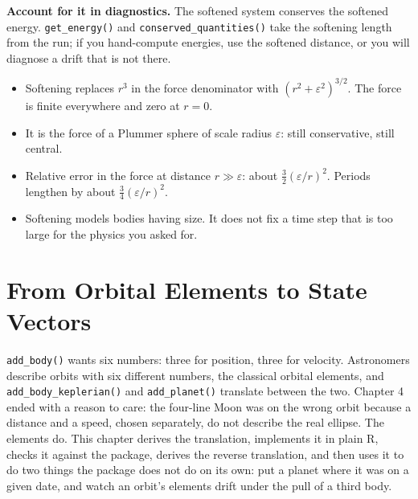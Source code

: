 \documentclass[
  10.5pt,
  letterpaper,
]{scrbook}
\providecommand{\tightlist}{%
  \setlength{\itemsep}{0pt}\setlength{\parskip}{0pt}}
\theoremstyle{plain}
\theoremstyle{remark}
\begin{document}
\textbf{Account for it in diagnostics.} The softened system conserves
the softened energy. \texttt{get\_energy()} and
\texttt{conserved\_quantities()} take the softening length from the run;
if you hand-compute energies, use the softened distance, or you will
diagnose a drift that is not there.

\begin{tcolorbox}[enhanced jigsaw, arc=.35mm, bottomrule=.15mm, bottomtitle=1mm, breakable, colback=white, colbacktitle=quarto-callout-tip-color!10!white, colframe=quarto-callout-tip-color-frame, coltitle=black, left=2mm, leftrule=.75mm, opacityback=0, opacitybacktitle=0.6, rightrule=.15mm, title={Key results}, titlerule=0mm, toprule=.15mm, toptitle=1mm]

\begin{itemize}
\tightlist
\item
  Softening replaces \(r^3\) in the force denominator with
  \((r^2+\varepsilon^2)^{3/2}\). The force is finite everywhere and zero
  at \(r = 0\).
\item
  It is the force of a Plummer sphere of scale radius \(\varepsilon\):
  still conservative, still central.
\item
  Relative error in the force at distance \(r \gg \varepsilon\): about
  \(\tfrac32(\varepsilon/r)^2\). Periods lengthen by about
  \(\tfrac34(\varepsilon/r)^2\).
\item
  Softening models bodies having size. It does not fix a time step that
  is too large for the physics you asked for.
\end{itemize}

\end{tcolorbox}

\chapter{From Orbital Elements to State Vectors}\label{sec-keplerian}

\texttt{add\_body()} wants six numbers: three for position, three for
velocity. Astronomers describe orbits with six different numbers, the
classical orbital elements, and \texttt{add\_body\_keplerian()} and
\texttt{add\_planet()} translate between the two. Chapter 4 ended with a
reason to care: the four-line Moon was on the wrong orbit because a
distance and a speed, chosen separately, do not describe the real
ellipse. The elements do. This chapter derives the translation,
implements it in plain R, checks it against the package, derives the
reverse translation, and then uses it to do two things the package does
not do on its own: put a planet where it was on a given date, and watch
an orbit's elements drift under the pull of a third body.
\end{document}
